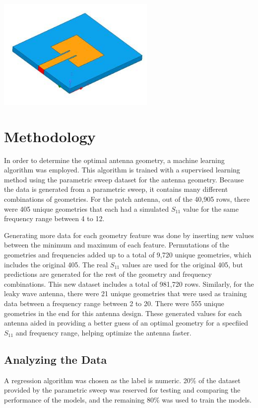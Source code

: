 \documentclass[lettersize,journal]{IEEEtran}
\newenvironment{Figure}
    {\par\medskip\noindent\minipage{\linewidth}}
    {\endminipage\par\medskip}
\begin{document}
\begin{Figure}
\centering
\includegraphics[width=3.0in]{patch_antenna.jpg}
\label{patch_antenna}
\end{Figure}


\section{Methodology}
In order to determine the optimal antenna geometry, a machine learning algorithm was employed. This algorithm is trained with a supervised learning method using the parametric sweep dataset for the antenna geometry. Because the data is generated from a parametric sweep, it contains many different combinations of geometries. For the patch antenna, out of the 40,905 rows, there were 405 unique geometries that each had a simulated $S_{11}$ value for the same frequency range between 4 to 12.

Generating more data for each geometry feature was done by inserting new values between the minimum and maximum of each feature. Permutations of the geometries and frequencies added up to a total of 9,720 unique geometries, which includes the original 405. The real $S_{11}$ values are used for the original 405, but predictions are generated for the rest of the geometry and frequency combinations. This new dataset includes a total of 981,720 rows. Similarly, for the leaky wave antenna, there were 21 unique geometries that were used as training data between a frequency range between 2 to 20. There were 555 unique geometries in the end for this antenna design. These generated values for each antenna aided in providing a better guess of an optimal geometry for a specfiied $S_{11}$ and frequency range, helping optimize the antenna faster. 

\subsection{Analyzing the Data}
A regression algorithm was chosen as the label is numeric. 20\% of the dataset provided by the parametric sweep was reserved for testing and comparing the performance of the models, and the remaining 80\% was used to train the models.
\end{document}

